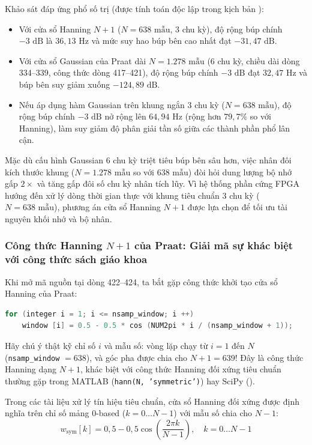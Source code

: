 Khảo sát đáp ứng phổ số trị (được tính toán độc lập trong kịch bản ):
\begin{itemize}[leftmargin=1.5em, itemsep=2pt]
    \item Với cửa sổ Hanning $N+1$ ($N = 638\text{ mẫu}$, 3 chu kỳ), độ rộng búp chính $-3\text{ dB}$ là $36{,}13\text{ Hz}$ và mức suy hao búp bên cao nhất đạt $-31{,}47\text{ dB}$.
    \item Với cửa sổ Gaussian của Praat dài $N = 1.278\text{ mẫu}$ (6 chu kỳ, chiều dài dòng 334--339, công thức dòng 417--421), độ rộng búp chính $-3\text{ dB}$ đạt $32{,}47\text{ Hz}$ và búp bên suy giảm xuống $-124{,}89\text{ dB}$.
    \item Nếu áp dụng hàm Gaussian trên khung ngắn 3 chu kỳ ($N = 638\text{ mẫu}$), độ rộng búp chính $-3\text{ dB}$ nở rộng lên $64{,}94\text{ Hz}$ (rộng hơn $79{,}7\%$ so với Hanning), làm suy giảm độ phân giải tần số giữa các thành phần phổ lân cận.
\end{itemize}
Mặc dù cấu hình Gaussian 6 chu kỳ triệt tiêu búp bên sâu hơn, việc nhân đôi kích thước khung ($N = 1.278\text{ mẫu}$ so với $638\text{ mẫu}$) đòi hỏi dung lượng bộ nhớ gấp $2\times$ và tăng gấp đôi số chu kỳ nhân tích lũy. Vì hệ thống phần cứng FPGA hướng đến xử lý dòng thời gian thực với khung tiêu chuẩn 3 chu kỳ ($N = 638\text{ mẫu}$), phương án cửa sổ Hanning $N+1$ được lựa chọn để tối ưu tài nguyên khối nhớ và bộ nhân.

\subsubsection*{Công thức Hanning $N+1$ của Praat: Giải mã sự khác biệt với công thức sách giáo khoa}
Khi mở mã nguồn  tại dòng 422--424, ta bắt gặp công thức khởi tạo cửa sổ Hanning của Praat:
\begin{lstlisting}[language=C++, numbers=none]
for (integer i = 1; i <= nsamp_window; i ++)
    window [i] = 0.5 - 0.5 * cos (NUM2pi * i / (nsamp_window + 1));
\end{lstlisting}

Hãy chú ý thật kỹ chỉ số $i$ và mẫu số: vòng lặp chạy từ $i = 1$ đến $N$ (\texttt{nsamp\_window} $= 638$), và góc pha được chia cho $N + 1 = 639$! Đây là công thức Hanning dạng $N+1$, khác biệt với công thức Hanning đối xứng tiêu chuẩn thường gặp trong MATLAB (\texttt{hann(N, 'symmetric')}) hay SciPy ().

Trong các tài liệu xử lý tín hiệu tiêu chuẩn, cửa sổ Hanning đối xứng được định nghĩa trên chỉ số mảng $0$-based ($k = 0 \dots N-1$) với mẫu số chia cho $N - 1$:
\begin{equation}
w_{\text{sym}}[k] = 0{,}5 - 0{,}5 \cos\left( \frac{2\pi k}{N - 1} \right), \quad k = 0 \dots N-1
\end{equation}

